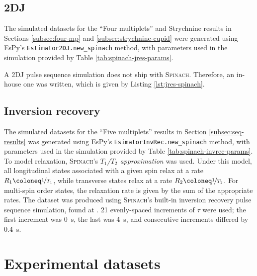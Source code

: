 

\subsection{\acs{2DJ}}
The simulated datasets for the ``Four multiplets'' and Strychnine results in
Sections \ref{subsec:four-mp} and \ref{subsec:strychnine-cupid} were generated
using \ac{EsPy}'s \texttt{Estimator2DJ.new_spinach} method, with
parameters used in the simulation provided by Table
\ref{tab:spinach-jres-params}.



A \ac{2DJ} pulse sequence simulation does not ship with \textsc{Spinach}.
Therefore, an in-house one was written, which is given by Listing
\ref{lst:jres-spinach}.


\subsection{Inversion recovery}
The simulated datasets for the ``Five multiplets'' results in
Section \ref{subsec:seq-results} was generated using \ac{EsPy}'s
\texttt{EsimatorInvRec.new_spinach} method, with
parameters used in the simulation provided by Table
\ref{tab:spinach-invrec-params}.
To model relaxation, \textsc{Spinach}'s \emph{$T_1$/$T_2$ approximation} was
used\cite{SpinachRelax}. Under this model, all longitudinal states associated
with a given spin relax at a rate $R_1 \coloneq \nicefrac{1}{T_1}$, while
transverse states relax at a rate $R_2 \coloneq \nicefrac{1}{T_2}$. For
multi-spin order states, the relaxation rate is given by the sum of the
appropriate rates. The dataset was produced using \textsc{Spinach}'s built-in
inversion recovery pulse sequence simulation, found at
. 21 evenly-spaced increments of
$\tau$ were used; the first increment was \qty{0}{\second}, the last was
\qty{4}{\second}, and consecutive increments differed by \qty{0.4}{\second}.



\section{Experimental datasets}

